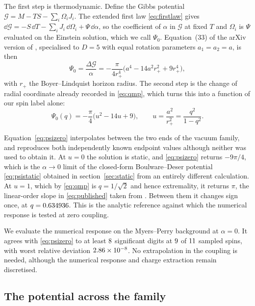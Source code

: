 \documentclass[11pt,a4paper]{article}
\begin{document}
The first step is thermodynamic. Define the Gibbs potential
$\mathcal G=M-TS-\sum_i\Omega_iJ_i$. The extended first law
\eqref{eq:firstlaw} gives
$\dd\mathcal G=-S\,\dd T-\sum_iJ_i\,\dd\Omega_i+\Psi\,\dd\alpha$, so the
coefficient of $\alpha$ in $\mathcal G$ at fixed $T$ and $\Omega_i$ is
$\Psi$ evaluated on the Einstein solution, which we call $\Psi_0$.
Equation~(33) of the arXiv version of \cite{Wu:2024xnb}, specialised to $D=5$
with equal rotation parameters $a_1=a_2=a$, is then
\begin{equation*}
 \Psi_0=\frac{\Delta\mathcal G}{\alpha}
 =-\frac{\pi}{4r_+^4}\bigl(a^4-14a^2r_+^2+9r_+^4\bigr),
\end{equation*}
with $r_+$ the Boyer--Lindquist horizon radius.
The second step is the change of radial coordinate already recorded in
\eqref{eq:qmp}, which turns this into a function of our spin label alone:
\begin{equation}
 \Psi_0(q)=-\frac\pi4\bigl(u^2-14u+9\bigr),\qquad
 u=\frac{a^2}{r_+^2}=\frac{q^2}{1-q^2}.
 \label{eq:psizero}
\end{equation}

Equation~\eqref{eq:psizero} interpolates between the two ends of the vacuum
family, and reproduces both independently known endpoint values although
neither was used to obtain it. At $u=0$ the solution is static, and
\eqref{eq:psizero} returns $-9\pi/4$, which is the $\alpha\to0$ limit of the
closed-form Boulware--Deser potential \eqref{eq:psistatic} obtained in
section~\ref{sec:static} from an entirely different calculation. At $u=1$,
which by \eqref{eq:qmp} is $q=1/\sqrt2$ and hence extremality, it returns
$\pi$, the linear-order slope in \eqref{eq:published} taken from
\cite{Ma:2020xwi}. Between them it changes sign once, at
$q=0.634936$. This is the analytic reference against which the
numerical response is tested at zero coupling.

We evaluate the numerical response on the Myers--Perry background at
$\alpha=0$. It agrees with \eqref{eq:psizero} to at least
$8$ significant digits at $9$ of
$11$ sampled spins, with worst relative deviation
$2.86\times 10^{-8}$. No extrapolation in the coupling is needed, although
the numerical response and charge extraction remain discretised.

\subsection{The potential across the family}
\end{document}
